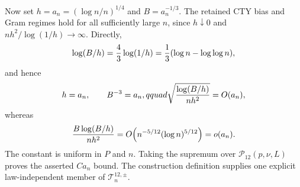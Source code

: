 Now set \(h=a_n=(\log n/n)^{1/4}\) and \(B=a_n^{-1/3}\).  The retained CTY bias and Gram regimes hold for all sufficiently large \(n\), since \(h\downarrow0\) and \(nh^2/\log(1/h)\to\infty\).  Directly,
\[
 \log(B/h)={4\over3}\log(1/h)
 ={1\over3}(\log n-\log\log n),
\]
and hence
\[
 h=a_n,\qquad B^{-3}=a_n,qquad
 \sqrt{{\log(B/h)\over nh^2}}=O(a_n),
\]
whereas
\[
 {B\log(B/h)\over nh^2}
 =O\!\left(n^{-5/12}(\log n)^{5/12}\right)=o(a_n).
\]
The constant is uniform in \(P\) and \(n\).  Taking the supremum over \(\mathcal P_{12}(p,\nu,L)\) proves the asserted \(Ca_n\) bound.  The construction definition supplies one explicit law-independent member of \(\mathcal T_n^{12,\pm}\).